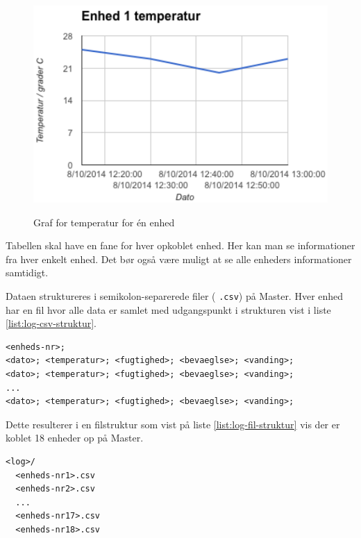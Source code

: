 \begin{figure}[htbp] \centering
{\includegraphics[scale=0.5]{filer/pics/SW-Log-graf}}
\caption{Graf for temperatur for én enhed}
\label{fig:log-graf}
\end{figure}

Tabellen skal have en fane for hver opkoblet enhed. Her kan man se informationer fra hver enkelt enhed. Det bør også være muligt at se alle enheders informationer samtidigt.

Dataen struktureres i semikolon-separerede filer ( \verb+.csv+) på Master. Hver enhed har en fil hvor alle data er samlet med udgangspunkt i strukturen vist i liste \ref{list:log-csv-struktur}.

\begin{lstlisting}[caption=Semikolon-separeret datafil til log af enheder, label={list:log-csv-struktur}]
<enheds-nr>;
<dato>; <temperatur>; <fugtighed>; <bevaeglse>; <vanding>;
<dato>; <temperatur>; <fugtighed>; <bevaeglse>; <vanding>;
...
<dato>; <temperatur>; <fugtighed>; <bevaeglse>; <vanding>;
\end{lstlisting}

Dette resulterer i en filstruktur som vist på liste \ref{list:log-fil-struktur} vis der er koblet 18 enheder op på Master.

\begin{lstlisting}[caption=Filstruktur for logfiler på Master, label={list:log-fil-struktur}]
<log>/
  <enheds-nr1>.csv
  <enheds-nr2>.csv
  ...
  <enheds-nr17>.csv
  <enheds-nr18>.csv
\end{lstlisting}
